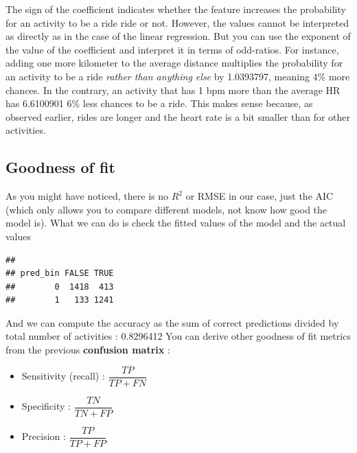 \documentclass[
]{book}
\newenvironment{Shaded}{\begin{snugshade}}{\end{snugshade}}
\newcommand{\DataTypeTok}[1]{\textcolor[rgb]{0.13,0.29,0.53}{#1}}
\newcommand{\DecValTok}[1]{\textcolor[rgb]{0.00,0.00,0.81}{#1}}
\newcommand{\KeywordTok}[1]{\textcolor[rgb]{0.13,0.29,0.53}{\textbf{#1}}}
\newcommand{\NormalTok}[1]{#1}
\newcommand{\OperatorTok}[1]{\textcolor[rgb]{0.81,0.36,0.00}{\textbf{#1}}}
\newcommand{\StringTok}[1]{\textcolor[rgb]{0.31,0.60,0.02}{#1}}
\providecommand{\tightlist}{%
  \setlength{\itemsep}{0pt}\setlength{\parskip}{0pt}}
\begin{document}
The sign of the coefficient indicates whether the feature increases the probability for an activity to be a ride ride or not. However, the values cannot be interpreted as directly as in the case of the linear regression. But you can use the exponent of the value of the coefficient and interpret it in terms of odd-ratios.
For instance, adding one more kilometer to the average distance multiplies the probability for an activity to be a ride \emph{rather than anything else} by 1.0393797, meaning 4\% more chances. In the contrary, an activity that has 1 bpm more than the average HR has 6.6100901 6\% less chances to be a ride. This makes sense because, as observed earlier, rides are longer and the heart rate is a bit smaller than for other activities.

\hypertarget{goodness-of-fit}{%
\subsection{Goodness of fit}\label{goodness-of-fit}}

As you might have noticed, there is no \(R^2\) or RMSE in our case, just the AIC (which only allows you to compare different models, not know how good the model is). What we can do is check the fitted values of the model and the actual values

\begin{Shaded}
\end{Shaded}

\begin{verbatim}
##         
## pred_bin FALSE TRUE
##        0  1418  413
##        1   133 1241
\end{verbatim}

And we can compute the accuracy as the sum of correct predictions divided by total number of activities : 0.8296412
You can derive other goodness of fit metrics from the previous \textbf{confusion matrix} :

\begin{itemize}
\tightlist
\item
  Sensitivity (recall) : \(\dfrac{TP}{TP+FN}\)
\item
  Specificity : \(\dfrac{TN}{TN+FP}\)
\item
  Precision : \(\dfrac{TP}{TP+FP}\)
\end{itemize}
\end{document}
